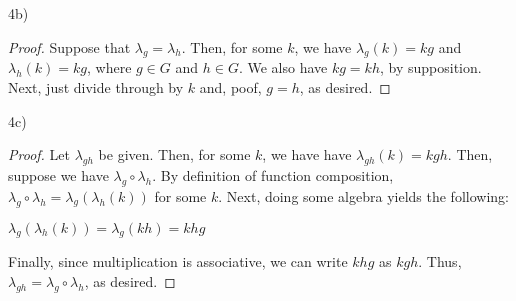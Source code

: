 \documentclass[executivepaper]{article}
\begin{document}
\begin{flushleft}

4b)

\begin{center}

\begin{proof}

Suppose that $\lambda_{g}=\lambda_{h}$. Then, for some $k$, we have $\lambda_{g}(k)=kg$ and $\lambda_{h}(k)=kg$, where $g \in G$ and $h \in G$. We also have $kg=kh$, by supposition. Next, just divide through by $k$ and, poof, $g=h$, as desired.

\end{proof}

\end{center}

\end{flushleft}

\pagebreak

\vspace*{-40mm}

\begin{flushleft}
4c)

\begin{center}

\begin{proof}

Let $\lambda_{gh}$ be given. Then, for some $k$, we have have $\lambda_{gh}(k)=kgh$. Then, suppose we have $\lambda_{g} \circ \lambda_{h}$. By definition of function composition, $\lambda_{g} \circ \lambda_{h}=\lambda{_g}(\lambda_{h}(k))$ for some $k$. Next, doing some algebra yields the following:

\begin{center}

$\lambda{_g}(\lambda_{h}(k))=\lambda_{g}(kh)=khg$

\end{center}

Finally, since multiplication is associative, we can write $khg$ as $kgh$. Thus, $\lambda_{gh}=\lambda_{g} \circ \lambda_{h}$, as desired.

\end{proof}

\end{center}

\end{flushleft}
\end{document}
